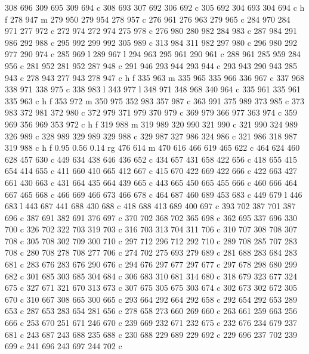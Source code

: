 {{   308 696 309 695 309 694 c
   308 693 307 692 306 692 c
   305 692 304 693 304 694 c
   h f
   278 947 m
   279 950 279 954 278 957 c
   276 961 276 963 279 965 c
   284 970 284 971 277 972 c
   272 974 272 974 275 978 c
   276 980 280 982 284 983 c
   287 984 291 986 292 988 c
   295 992 299 992 305 989 c
   313 984 311 982 297 980 c
   296 980 292 977 290 974 c
   285 969 l
   289 967 l
   294 963 295 961 290 961 c
   288 961 285 959 284 956 c
   281 952 281 952 287 948 c
   291 946 293 944 293 944 c
   293 943 290 943 285 943 c
   278 943 277 943 278 947 c
   h f
   335 963 m
   335 965 335 966 336 967 c
   337 968 338 971 338 975 c
   338 983 l
   343 977 l
   348 971 348 968 340 964 c
   335 961 335 961 335 963 c
   h f
   353 972 m
   350 975 352 983 357 987 c
   363 991 375 989 373 985 c
   373 983 372 981 372 980 c
   372 979 371 979 370 979 c
   369 979 366 977 363 974 c
   359 969 356 969 353 972 c
   h f
   319 988 m
   319 989 320 990 321 990 c
   321 990 324 989 326 989 c
   328 989 329 989 329 988 c
   329 987 327 986 324 986 c
   321 986 318 987 319 988 c
   h f
   0.95 0.56 0.14 rg
   476 614 m
   470 616 466 619 465 622 c
   464 624 460 628 457 630 c
   449 634 438 646 436 652 c
   434 657 431 658 422 656 c
   418 655 415 654 414 655 c
   411 660 410 665 412 667 c
   415 670 422 669 422 666 c
   422 663 427 661 430 663 c
   431 664 435 664 439 665 c
   443 665 450 665 455 666 c
   460 666 464 667 465 668 c
   466 669 466 673 466 678 c
   464 687 460 689 453 683 c
   449 679 l
   446 683 l
   443 687 441 688 430 688 c
   418 688 413 689 400 697 c
   393 702 387 701 387 696 c
   387 691 382 691 376 697 c
   370 702 368 702 365 698 c
   362 695 337 696 330 700 c
   326 702 322 703 319 703 c
   316 703 313 704 311 706 c
   310 707 308 708 307 708 c
   305 708 302 709 300 710 c
   297 712 296 712 292 710 c
   289 708 285 707 283 708 c
   280 708 278 708 277 706 c
   274 702 275 693 279 689 c
   281 688 283 684 283 681 c
   283 676 283 676 290 676 c
   294 676 297 677 297 677 c
   297 678 298 680 299 682 c
   301 685 303 685 304 684 c
   306 683 310 681 314 680 c
   318 679 323 677 324 675 c
   327 671 321 670 313 673 c
   307 675 305 675 303 674 c
   302 673 302 672 305 670 c
   310 667 308 665 300 665 c
   293 664 292 664 292 658 c
   292 654 292 653 289 653 c
   287 653 283 654 281 656 c
   278 658 273 660 269 660 c
   263 661 259 663 256 666 c
   253 670 251 671 246 670 c
   239 669 232 671 232 675 c
   232 676 234 679 237 681 c
   243 687 243 688 235 688 c
   230 688 229 689 229 692 c
   229 696 237 702 239 699 c
   241 696 243 697 244 702 c
}}
